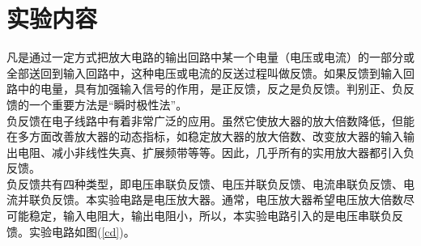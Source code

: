 \documentclass[a4paper]{article}
\begin{document}
\section{实验内容}
凡是通过一定方式把放大电路的输出回路中某一个电量（电压或电流）的一部分或全部送回到输入回路中，这种电压或电流的反送过程叫做反馈。如果反馈到输入回路中的电量，具有加强输入信号的作用，是正反馈，反之是负反馈。判别正、负反馈的一个重要方法是“瞬时极性法”。\\
负反馈在电子线路中有着非常广泛的应用。虽然它使放大器的放大倍数降低，但能在多方面改善放大器的动态指标，如稳定放大器的放大倍数、改变放大器的输入输出电阻、减小非线性失真、扩展频带等等。因此，几乎所有的实用放大器都引入负反馈。\\
负反馈共有四种类型，即电压串联负反馈、电压并联负反馈、电流串联负反馈、电流并联负反馈。本实验电路是电压放大器。通常，电压放大器希望电压放大倍数尽可能稳定，输入电阻大，输出电阻小，所以，本实验电路引入的是电压串联负反馈。实验电路如图(\ref{cd})。
\end{document}
